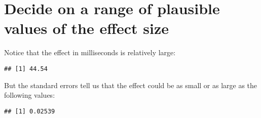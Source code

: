 \documentclass[12pt,]{krantz}
\newenvironment{Shaded}{\begin{snugshade}}{\end{snugshade}}
\newcommand{\CommentTok}[1]{\textcolor[rgb]{0.56,0.35,0.01}{\textit{#1}}}
\newcommand{\DecValTok}[1]{\textcolor[rgb]{0.00,0.00,0.81}{#1}}
\newcommand{\FloatTok}[1]{\textcolor[rgb]{0.00,0.00,0.81}{#1}}
\newcommand{\KeywordTok}[1]{\textcolor[rgb]{0.13,0.29,0.53}{\textbf{#1}}}
\newcommand{\NormalTok}[1]{#1}
\newcommand{\OperatorTok}[1]{\textcolor[rgb]{0.81,0.36,0.00}{\textbf{#1}}}
\newcommand{\StringTok}[1]{\textcolor[rgb]{0.31,0.60,0.02}{#1}}
\begin{document}
\hypertarget{decide-on-a-range-of-plausible-values-of-the-effect-size}{%
\section{Decide on a range of plausible values of the effect size}\label{decide-on-a-range-of-plausible-values-of-the-effect-size}}

Notice that the effect in milliseconds is relatively large:

\begin{Shaded}
\end{Shaded}

\begin{verbatim}
## [1] 44.54
\end{verbatim}

But the standard errors tell us that the effect could be as small or as large as the following values:

\begin{Shaded}
\end{Shaded}

\begin{verbatim}
## [1] 0.02539
\end{verbatim}
\end{document}
